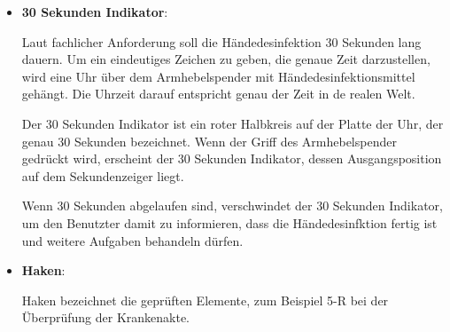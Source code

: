 \begin{itemize}
      \item \textbf{30 Sekunden Indikator}:
      
      Laut fachlicher Anforderung soll die Händedesinfektion 30 Sekunden lang dauern. Um ein eindeutiges Zeichen zu geben, die genaue Zeit darzustellen, wird eine Uhr über dem Armhebelspender mit Händedesinfektionsmittel gehängt. Die Uhrzeit darauf entspricht genau der Zeit in de realen Welt.
      
      Der 30 Sekunden Indikator ist ein roter Halbkreis auf der Platte der Uhr, der genau 30 Sekunden bezeichnet. Wenn der Griff des Armhebelspender gedrückt wird, erscheint der 30 Sekunden Indikator, dessen Ausgangsposition auf dem Sekundenzeiger liegt.
      
      Wenn 30 Sekunden abgelaufen sind, verschwindet der 30 Sekunden Indikator, um den Benutzter damit zu informieren, dass die Händedesinfktion fertig ist und weitere Aufgaben behandeln dürfen.
      
      \item \textbf{Haken}:
      
      Haken bezeichnet die geprüften Elemente, zum Beispiel 5-R bei der Überprüfung der Krankenakte.
  \end{itemize}
  
